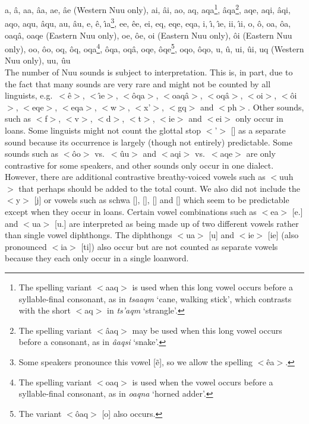 a, \^{a}, aa, \^{a}a, ae, \^{a}e (Western N\textipa{\textvertline}uu
only), ai, \^{a}i, ao, aq, aqa\footnote{The spelling variant $<$aaq$>$
is used when this long vowel occurs before a syllable-final consonant,
as in \emph{tsaaqm} `cane, walking stick', which contrasts with the
short $<$aq$>$ in \emph{ts'aqm} `strangle'.}, \^{a}qa\footnote{The
spelling variant $<$\^{a}aq$>$ may be used when this long vowel occurs
before a consonant, as in \emph{\textipa{\textvertline}\^{a}aqsi}
`snake'.}, aqe, aqi, \^{a}qi, aqo, aqu, \^{a}qu, au, \^{a}u, e, \^{e},
\^{\i}a\footnote{Some speakers pronounce this vowel
[\~{e}], so we allow the spelling $<$\^{e}a$>$.}, ee,
\^{e}e, ei, eq, eqe, eqa, i, \^{\i}, \^{\i}e, ii, \^{\i}i, o, \^{o},
oa, \^{o}a, oaq\^{a}, oaqe (Eastern N\textipa{\textvertline}uu only),
oe, \^{o}e, oi (Eastern N\textipa{\textvertline}uu only), \^{o}i
(Eastern N\textipa{\textvertline}uu only), oo, \^{o}o, oq, \^{o}q,
oqa\footnote{The spelling variant $<$oaq$>$ is used when the vowel
occurs before a syllable-final consonant, as in
\emph{oaqna} `horned adder'.}, \^{o}qa, oq\^{a}, oqe,
\^{o}qe\footnote{The variant $<$\^{o}aq$>$
[o\textipa{\textbarrevglotstop{}}\textipa{\textbarrevglotstop{}}]
also occurs.}, oqo, \^{o}qo, u, \^{u}, ui, \^{u}i, uq (Western
N\textipa{\textvertline}uu only), uu, \^{u}u\\

The number of N\textipa{\textvertline}uu sounds is subject to
interpretation. This is, in part, due to the fact that many sounds are
very rare and might not be counted by all linguists, e.g.\
$<$\^{e}$>$, $<$\^{\i}e$>$, $<$\^{o}qa$>$, $<$oaq\^{a}$>$,
$<$oq\^{a}$>$, $<$oi$>$, $<$\^{o}i$>$, $<$eqe$>$, $<$eqa$>$, $<$w$>$,
$<$\textipa{\!o}x'$>$, $<$g\textipa{\textvertline}q$>$ and $<$ph$>$.
Other sounds, such as $<$f$>$, $<$v$>$, $<$d$>$, $<$t$>$, $<$ie$>$ and
$<$ei$>$ only occur in loans. Some linguists might not count the
glottal stop $<$'$>$ [\textipa{P}] as a separate sound because its
occurrence is largely (though not entirely) predictable. Some sounds
such as $<$\^{o}o$>$ vs.\ $<$\^{u}u$>$ and $<$aqi$>$ vs.\ $<$aqe$>$
are only contrastive for some speakers, and other sounds only occur in
one dialect. However, there are additional contrastive breathy-voiced
vowels such as $<$uuh$>$ that perhaps should be added to the total
count. We also did not include the $<$y$>$ [j] or vowels such as
schwa [\textipa{@}], [\textipa{E}], [\textipa{U}] and []
which seem to be predictable except when they occur in loans. Certain
vowel combinations such as $<$ea$>$ [e.] and $<$ua$>$
[u.\textipa{A}] are interpreted as being made up of two different
vowels rather than single vowel diphthongs. The diphthongs $<$ua$>$
[u\textipa{@}] and $<$ie$>$ [ie] (also pronounced $<$ia$>$
[ti]) also occur but are not counted as separate vowels
because they each only occur in a single loanword.\\

